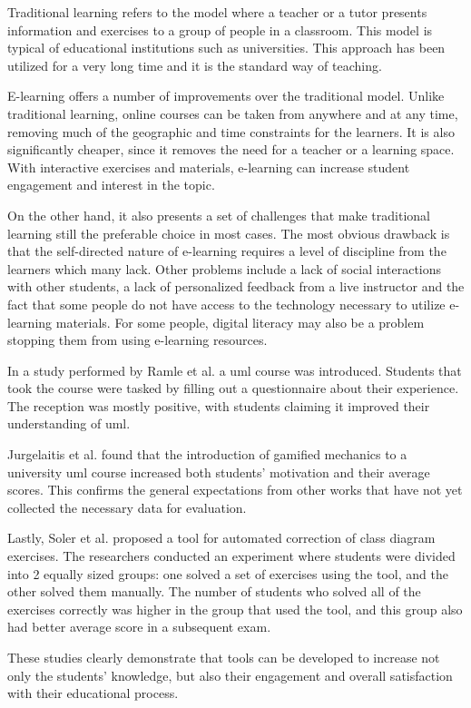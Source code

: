 
Traditional learning refers to the model where a teacher or a tutor presents information and exercises to a group of people in a classroom. This model is typical of educational institutions such as universities. This approach has been utilized for a very long time and it is the standard way of teaching. 

E-learning offers a number of improvements over the traditional model. Unlike traditional learning, online courses can be taken from anywhere and at any time, removing much of the geographic and time constraints for the learners. It is also significantly cheaper, since it removes the need for a teacher or a learning space. With interactive exercises and materials, e-learning can increase student engagement and interest in the topic.

On the other hand, it also presents a set of challenges that make traditional learning still the preferable choice in most cases. The most obvious drawback is that the self-directed nature of e-learning requires a level of discipline from the learners which many lack. Other problems include a lack of social interactions with other students, a lack of personalized feedback from a live instructor and the fact that some people do not have access to the technology necessary to utilize e-learning materials. For some people, digital literacy may also be a problem stopping them from using e-learning resources.


In a study performed by Ramle et al.\cite{ramle2021uml} a \ac{uml} course was introduced. Students that took the course were tasked by filling out a questionnaire about their experience. The reception was mostly positive, with students claiming it improved their understanding of \ac{uml}.

Jurgelaitis et al.\cite{jurgelaitis2019implementing} found that the introduction of gamified mechanics to a university \ac{uml} course increased both students' motivation and their average scores. This confirms the general expectations from other works that have not yet collected the necessary data for evaluation. 

Lastly, Soler et al.\cite{soler2010formative} proposed a tool for automated correction of class diagram exercises. The researchers conducted an experiment where students were divided into 2 equally sized groups: one solved a set of exercises using the tool, and the other solved them manually. The number of students who solved all of the exercises correctly was higher in the group that used the tool, and this group also had better average score in a subsequent exam. 

These studies clearly demonstrate that tools can be developed to increase not only the students' knowledge, but also their engagement and overall satisfaction with their educational process. 